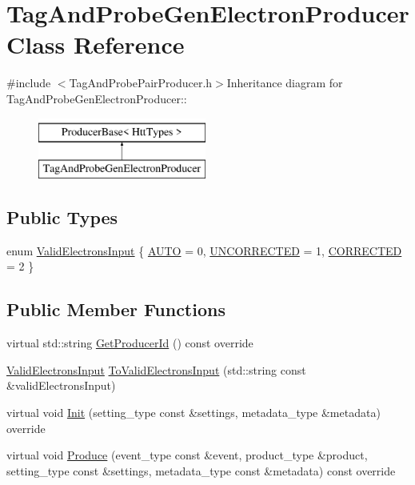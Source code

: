 \hypertarget{classTagAndProbeGenElectronProducer}{
\section{TagAndProbeGenElectronProducer Class Reference}
\label{classTagAndProbeGenElectronProducer}
}


{\ttfamily \#include $<$TagAndProbePairProducer.h$>$}Inheritance diagram for TagAndProbeGenElectronProducer::\begin{figure}[H]
\begin{center}
\leavevmode
\includegraphics[height=2cm]{classTagAndProbeGenElectronProducer}
\end{center}
\end{figure}
\subsection*{Public Types}
\begin{DoxyCompactItemize}
\item 
enum \hyperlink{classTagAndProbeGenElectronProducer_a1789c38842bed4e182a87a5ca01429ce}{ValidElectronsInput} \{ \hyperlink{classTagAndProbeGenElectronProducer_a1789c38842bed4e182a87a5ca01429cea9b83f0422ada66a26637b0381a0ac535}{AUTO} =  0, 
\hyperlink{classTagAndProbeGenElectronProducer_a1789c38842bed4e182a87a5ca01429ceab2f4c5d2a0bd591efe77dab28f3c48b3}{UNCORRECTED} =  1, 
\hyperlink{classTagAndProbeGenElectronProducer_a1789c38842bed4e182a87a5ca01429ceade82ad74872c5d19264c8a150e877eee}{CORRECTED} =  2
 \}
\end{DoxyCompactItemize}
\subsection*{Public Member Functions}
\begin{DoxyCompactItemize}
\item 
virtual std::string \hyperlink{classTagAndProbeGenElectronProducer_ab58919b4df408e2a9d59aa68655bd6bc}{GetProducerId} () const override
\item 
\hyperlink{classTagAndProbeGenElectronProducer_a1789c38842bed4e182a87a5ca01429ce}{ValidElectronsInput} \hyperlink{classTagAndProbeGenElectronProducer_a364d8f75510c1453409c70309a437417}{ToValidElectronsInput} (std::string const \&validElectronsInput)
\item 
virtual void \hyperlink{classTagAndProbeGenElectronProducer_a48e61491e4cf956c1cd5a81219d43d6f}{Init} (setting\_\-type const \&settings, metadata\_\-type \&metadata) override
\item 
virtual void \hyperlink{classTagAndProbeGenElectronProducer_a8dc74cf238c8f0c32b2e4eadd1879e66}{Produce} (event\_\-type const \&event, product\_\-type \&product, setting\_\-type const \&settings, metadata\_\-type const \&metadata) const override
\end{DoxyCompactItemize}


